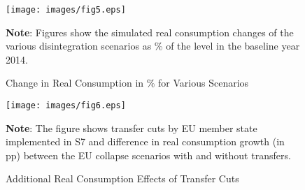 \documentclass[a4paper,12pt]{article}
\begin{document}
\begin{figure}[t!]
\centering
\caption{Change in Real Consumption in \% for Various Scenarios}
\vspace{0.25cm}
\label{fig:welfare}
\texttt{[image: images/fig5.eps]}
\begin{fignote}{\textwidth}{\scriptsize{\textbf{Note}: Figures show the simulated real consumption changes of the various disintegration scenarios as \% of the level in the baseline year 2014.}}
\end{fignote}
\end{figure}%



\renewcommand{\tabcolsep}{.5cm}

\begin{table}[t!]
\centering
\caption{Changes in Real Consumption in \%, Baseline Year 2014}
\vspace{0.25cm}

\end{table}



\begin{figure}[h!]
\centering
\caption{Additional Real Consumption Effects of Transfer Cuts}
\vspace{0.25cm}

\label{fig:transfers}
\texttt{[image: images/fig6.eps]}
\begin{fignote}{1\textwidth}{\scriptsize{\textbf{Note}: The figure shows transfer cuts by EU member state implemented in S7 and difference in real consumption growth (in pp) between the EU collapse scenarios with and without transfers.}}\end{fignote}
\end{figure}%
\end{document}
